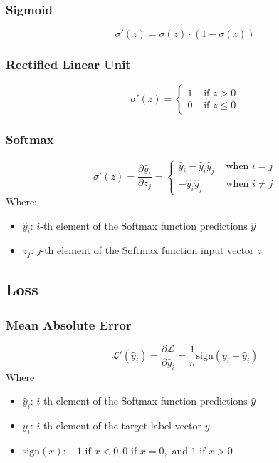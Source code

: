 \documentclass[a4paper]{article}
\newcommand{\haty}{\hat{y}}
\newcommand{\ELL}{\mathcal{L}}
\begin{document}
\subsubsection*{Sigmoid}
\begin{equation*}
    \sigma'(z) = \sigma(z) \cdot (1-\sigma(z))
\end{equation*}

\subsubsection*{Rectified Linear Unit}
\begin{equation*}
    \sigma'(z) = \begin{cases}
        1 & \text{ if } z > 0\\
        0 & \text{ if } z \leq 0
    \end{cases}
\end{equation*}

\subsubsection*{Softmax}
\begin{equation*}
    \sigma'(z) = \frac{\partial \haty_i}{\partial z_j} = \begin{cases}
        \haty_i-\haty_i\haty_j & \text{ when } i  =  j \\
               -\haty_i\haty_j & \text{ when } i\neq j
    \end{cases}
\end{equation*}
Where:
\begin{itemize}
    \item $\haty_i$: $i$-th element of the Softmax function predictions $\haty$
    \item $z_j$: $j$-th element of the Softmax function input vector $z$
\end{itemize}

\subsection*{Loss}
\subsubsection*{Mean Absolute Error}
\begin{equation*}
    \ELL'(\haty_i) = \frac{\partial\ELL}{\partial \haty_i} = \frac{1}{n}\text{sign}(y_i-\haty_i)
\end{equation*}
Where 
\begin{itemize}
    \item $\haty_i$: $i$-th element of the Softmax function predictions $\haty$
    \item $y_i$: $i$-th element of the target label vector $y$
    \item $\text{sign}(x)$: $-1 \text{ if } x < 0, 0 \text{ if } x = 0, \text{ and } 1 \text{ if } x > 0$
\end{itemize}
\end{document}
